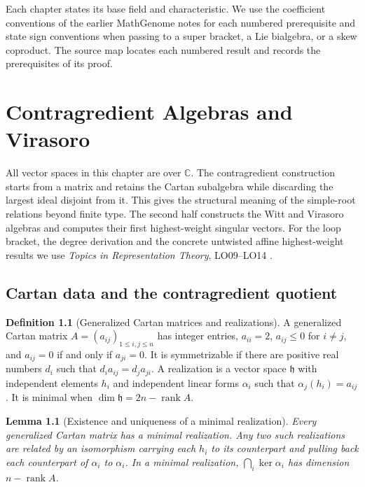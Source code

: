\documentclass[11pt,oneside,openany]{book}
\newtheorem{lemma}[theorem]{Lemma}
\theoremstyle{definition}
\newtheorem{definition}[theorem]{Definition}
\theoremstyle{remark}
\begin{document}
Each chapter states its base field and characteristic. We use the
coefficient conventions of the earlier MathGenome notes for each
numbered prerequisite and state sign conventions when passing to a
super bracket, a Lie bialgebra, or a skew coproduct. The source map
locates each numbered result and records the prerequisites of its
proof.

\mainmatter
\chapter{Contragredient Algebras and Virasoro}

All vector spaces in this chapter are over \(\mathbb C\).
The contragredient construction starts from a matrix and retains the
Cartan subalgebra while discarding the largest ideal disjoint from it.
This gives the structural meaning of the simple-root relations beyond
finite type. The second half constructs the Witt and Virasoro algebras
and computes their first highest-weight singular vectors.
For the loop bracket, the degree derivation and the concrete untwisted
affine highest-weight results we use \emph{Topics in Representation
Theory}, LO09--LO14 \cite[PDF pp.~26--28]{mg-reptopics}.

\section{Cartan data and the contragredient quotient}

\begin{definition}[Generalized Cartan matrices and realizations]
\label{res:KM01}
A generalized Cartan matrix \(A=(a_{ij})_{1\le i,j\le n}\) has
integer entries, \(a_{ii}=2\), \(a_{ij}\le0\) for \(i\ne j\), and
\(a_{ij}=0\) if and only if \(a_{ji}=0\). It is symmetrizable
if there are positive real numbers \(d_i\) such that
\(d_i a_{ij}=d_j a_{ji}\). A realization is a vector space
\(\mathfrak h\) with independent elements \(h_i\) and independent
linear forms \(\alpha_i\) such that
\(\alpha_j(h_i)=a_{ij}\). It is minimal when
\(\dim\mathfrak h=2n-\operatorname{rank}A\).
\end{definition}

\begin{lemma}[Existence and uniqueness of a minimal realization]
\label{res:KM02}
Every generalized Cartan matrix has a minimal realization. Any
two such realizations are related by an isomorphism carrying each
\(h_i\) to its counterpart and pulling back each counterpart of
\(\alpha_i\) to \(\alpha_i\). In a minimal realization,
\(\bigcap_i\ker\alpha_i\) has dimension \(n-\operatorname{rank}A\).
\end{lemma}
\end{document}

